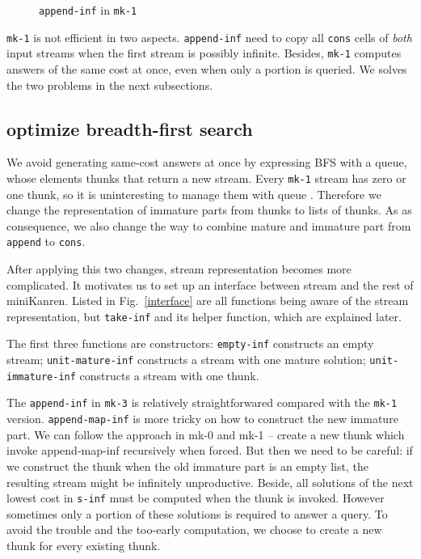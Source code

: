 \documentclass[format=acmlarge, review=true, authordraft=true]{acmart}
\begin{document}
\begin{figure}
	 	
	 \caption{\texttt{append-inf} in \texttt{mk-1}}
	 \label{append-inf-1}
\end{figure}

\texttt{mk-1} is not efficient in two aspects. \texttt{append-inf} need to copy 
all \texttt{cons} cells of \emph{both} input streams when the first stream is 
possibly infinite. Besides, \texttt{mk-1} computes answers of the same cost
at once, even when only a portion is queried. We solves the two problems in the 
next subsections.

\subsection{optimize breadth-first search}

We avoid generating same-cost answers at once by expressing BFS with a queue, 
whose elements thunks that return a new stream. Every \texttt{mk-1} stream has 
zero or one thunk, so it is uninteresting to manage them with queue . Therefore 
we change the representation of immature parts from thunks to 
lists of thunks. As as consequence, we also change the way to combine mature and 
immature part from \texttt{append} to \texttt{cons}. 

After applying this two changes, stream representation becomes more 
complicated. It motivates us to set up an interface between stream 
and the rest of miniKanren. Listed in Fig.~\ref{interface} are all functions 
being aware of the stream representation, but \texttt{take-inf} and its helper 
function, which are explained later. 

The first three functions are constructors: \texttt{empty-inf} constructs an 
empty stream; \texttt{unit-mature-inf} constructs a stream with one mature 
solution; \texttt{unit-immature-inf} constructs a stream with one thunk. 

The \texttt{append-inf} in \texttt{mk-3} is relatively straightforwared compared 
with the \texttt{mk-1} version. \texttt{append-map-inf} is more tricky on how to 
construct the new immature part. We can follow the approach in mk-0 and mk-1 -- 
create a new thunk which invoke append-map-inf recursively when forced. But then 
we need to be careful: if we construct the thunk when the old immature part is 
an empty list, the resulting stream might be infinitely unproductive. Beside, 
all solutions of the next lowest cost in \texttt{s-inf} must be computed when 
the thunk is invoked. However sometimes only a portion of these solutions is 
required to answer a query. To avoid the trouble and the too-early computation, 
we choose to create a new thunk for every existing thunk. 
\end{document}
